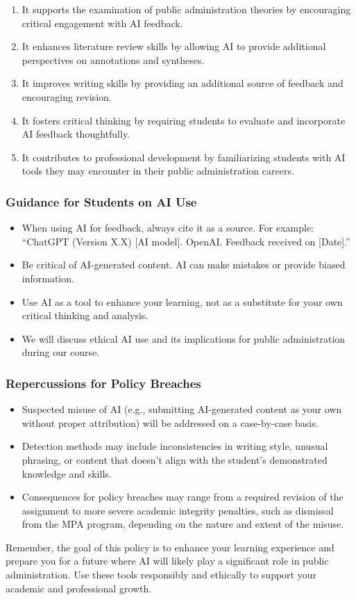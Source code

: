 \documentclass[11pt, letterpaper]{article}
\begin{document}
\begin{enumerate}
    \item It supports the examination of public administration theories by encouraging critical engagement with AI feedback.
    \item It enhances literature review skills by allowing AI to provide additional perspectives on annotations and syntheses.
    \item It improves writing skills by providing an additional source of feedback and encouraging revision.
    \item It fosters critical thinking by requiring students to evaluate and incorporate AI feedback thoughtfully.
    \item It contributes to professional development by familiarizing students with AI tools they may encounter in their public administration careers.
\end{enumerate}

\subsubsection*{Guidance for Students on AI Use}

\begin{itemize}
    \item When using AI for feedback, always cite it as a source. For example: ``ChatGPT (Version X.X) [AI model]. OpenAI. Feedback received on [Date].''
    \item Be critical of AI-generated content. AI can make mistakes or provide biased information.
    \item Use AI as a tool to enhance your learning, not as a substitute for your own critical thinking and analysis.
    \item We will discuss ethical AI use and its implications for public administration during our course.
\end{itemize}

\subsubsection*{Repercussions for Policy Breaches}

\begin{itemize}
    \item Suspected misuse of AI (e.g., submitting AI-generated content as your own without proper attribution) will be addressed on a case-by-case basis.
    \item Detection methods may include inconsistencies in writing style, unusual phrasing, or content that doesn't align with the student's demonstrated knowledge and skills.
    \item Consequences for policy breaches may range from a required revision of the assignment to more severe academic integrity penalties, such as dismissal from the MPA program, depending on the nature and extent of the misuse.
\end{itemize}
\noindent Remember, the goal of this policy is to enhance your learning experience and prepare you for a future where AI will likely play a significant role in public administration. Use these tools responsibly and ethically to support your academic and professional growth.
\end{document}
